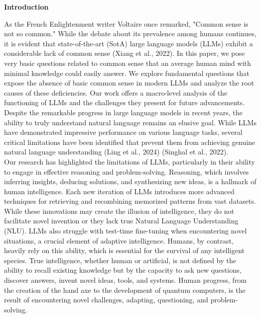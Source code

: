 \documentclass[11pt]{scrartcl}
\begin{document}
\begin{huge}
\textbf{Introduction}
\end{huge}
As the French Enlightenment writer Voltaire once remarked, "Common sense is not so common." While the debate about its prevalence among humans continues, it is evident that state-of-the-art (SotA) large language models (LLMs) exhibit a considerable lack of common sense (Xiang et al., 2022)\cite{ref10}. In this paper, we pose very basic questions related to common sense that an average human mind with minimal knowledge could easily answer. We explore fundamental questions that expose the absence of basic common sense in modern LLMs and analyze the root causes of these deficiencies. Our work offers a macro-level analysis of the functioning of LLMs and the challenges they present for future advancements. Despite the remarkable progress in large language models in recent years, the ability to truly understand natural language remains an elusive goal. While LLMs have demonstrated impressive performance on various language tasks, several critical limitations have been identified that prevent them from achieving genuine natural language understanding (Ling et al., 2024)\cite{ref6} (Singhal et al., 2022)\cite{ref7}. \\

Our research has highlighted the limitations of LLMs, particularly in their ability to engage in effective reasoning and problem-solving. Reasoning, which involves inferring insights, deducing solutions, and synthesizing new ideas, is a hallmark of human intelligence. Each new iteration of LLMs introduces more advanced techniques for retrieving and recombining memorized patterns from vast datasets. While these innovations may create the illusion of intelligence, they do not facilitate novel invention or they lack true Natural Language Understanding (NLU). LLMs also struggle with test-time fine-tuning when encountering novel situations, a crucial element of adaptive intelligence. Humans, by contrast, heavily rely on this ability, which is essential for the survival of any intelligent species. True intelligence, whether human or artificial, is not defined by the ability to recall existing knowledge but by the capacity to ask new questions, discover answers, invent novel ideas, tools, and systems. Human progress, from the creation of the hand axe to the development of quantum computers, is the result of encountering novel challenges, adapting, questioning, and problem-solving.\\
\end{document}
